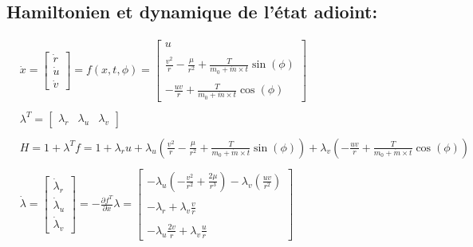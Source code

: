 \documentclass{article}
\begin{document}
		
		\subsection{Hamiltonien et dynamique de l'état adioint:}
		\begin{align*}
			& \dot{x}=\begin{bmatrix}
				\dot{r} \\
				\dot{u} \\
				\dot{v}
			\end{bmatrix}=f(x, t, \phi)=\begin{bmatrix}
				u \\ \\
				\frac{v^2}{r}-\frac{\mu}{r^2}+\frac{T}{m_0+\dot{m} \times t} \sin (\phi) \\ \\
				-\frac{u v}{r}+\frac{T}{m_0+\dot{m} \times t} \cos (\phi)
			\end{bmatrix} \\ \\
			& \lambda^T=\begin{bmatrix}
				\lambda_r & \lambda_u & \lambda_v
			\end{bmatrix} \\ \\
			& H=1+\lambda^T f=1+\lambda_r u+\lambda_u\left(\frac{v^2}{r}-\frac{\mu}{r^2}+\frac{T}{m_0+\dot{m} \times t} \sin (\phi)\right)+\lambda_v\left(-\frac{u v}{r}+\frac{T}{m_0+\dot{m} \times t} \cos (\phi)\right) \\ \\
			& \dot{\lambda}=\begin{bmatrix}
				\dot{\lambda}_r \\
				\dot{\lambda}_u \\
				\dot{\lambda}_v
			\end{bmatrix}=-\frac{\partial f^T}{\partial x} \lambda=\begin{bmatrix}
				-\lambda_u\left(-\frac{v^2}{r^2}+\frac{2 \mu}{r^3}\right)-\lambda_v\left(\frac{u v}{r^2}\right) \\ \\
				-\lambda_r+\lambda_v \frac{v}{r} \\ \\
				-\lambda_u \frac{2 v}{r}+\lambda_v \frac{u}{r}
			\end{bmatrix}
		\end{align*}
		
\end{document}

